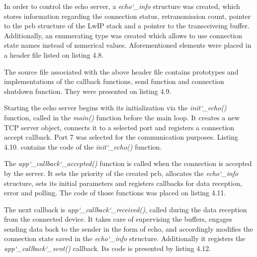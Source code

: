 

\newpage
{}

In order to control the echo server, a \textit{echo\char`_info} structure was created, which stores information regarding the connection status, retransmission count, pointer to the pcb structure of the LwIP stack and a pointer to the transceiveing buffer. Additionally, an enumerating type was created which allows to use connection state names instead of numerical values. Aforementioned elements were placed in a header file listed on listing 4.8. 


The source file associated with the above header file contains prototypes and implementations of the callback functions, send function and connection shutdown function. They were presented on listing 4.9.


Starting the echo server begins with its initialization via the \textit{init\char`_echo()} function, called in the \textit{main()} function before the main loop. It creates a new TCP server object, connects it to a selected port and registers a connection accept callback. Port 7 was selected for the communication purposes. Listing 4.10. contains the code of the \textit{init\char`_echo()} function.


The \textit{app\char`_callback\char`_accepted()} function is called when the connection is accepted by the server. It sets the priority of the created pcb, allocates the \textit{echo\char`_info} structure, sets its initial parameters and registers callbacks for data reception, error and polling. The code of those functions was placed on listing 4.11.


The next callback is \textit{app\char`_callback\char`_received()}, called during the data reception from the connected device. It takes care of supervising the buffers, engages sending data back to the sender in the form of echo, and accordingly modifies the connection state saved in the \textit{echo\char`_info} structure. Additionally it registers the \textit{app\char`_callback\char`_sent()} callback. Its code is presented by listing 4.12.


